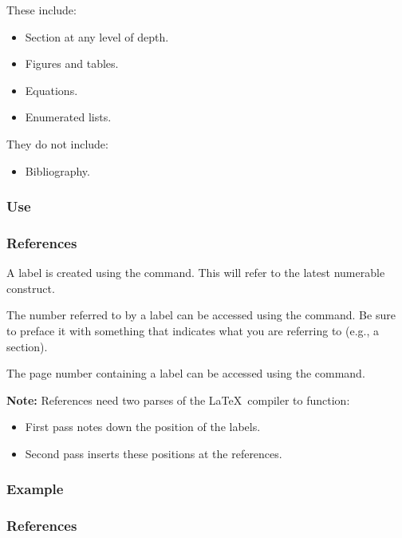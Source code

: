 {\begin{frame}[fragile]
  \vspace{5mm}
  These include:
  \begin{itemize}
    \item Section at any level of depth.
    \item Figures and tables.
    \item Equations.
    \item Enumerated lists.
  \end{itemize}
  
  \vspace{5mm}
  They do not include:
  \begin{itemize}
    \item Bibliography.
  \end{itemize}
\end{frame}

\subsubsection{Use}
\begin{frame}[fragile]
  \frametitle{References }
  \vspace{3mm}
  A label is created using the  command. This will refer to the latest numerable construct.
  
  \vspace{5mm}
  The number referred to by a label can be accessed using the  command. Be sure to preface it with something that indicates what you are referring to (e.g., a section).
  
  \vspace{5mm}
  The page number containing a label can be accessed using the  command.
  
  \vspace{5mm}
  \textbf{Note:} References need two parses of the \LaTeX\ compiler to function:
  \begin{itemize}
    \item First pass notes down the position of the labels.
    \item Second pass inserts these positions at the references.
  \end{itemize}
\end{frame}

\subsubsection{Example}
\begin{frame}[fragile]
  \frametitle{References }
\end{frame}}
